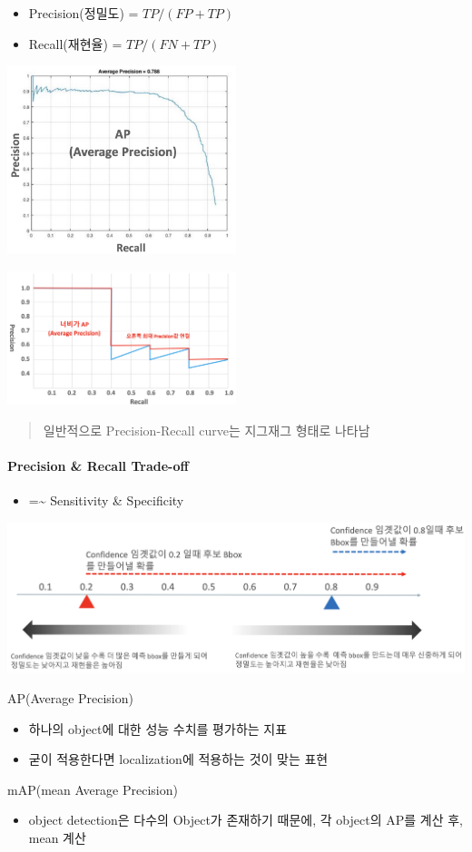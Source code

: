 \documentclass[
]{article}
\providecommand{\tightlist}{%
  \setlength{\itemsep}{0pt}\setlength{\parskip}{0pt}}
\begin{document}
\begin{itemize}
\tightlist
\item
  Precision(정밀도) = \(TP/(FP+TP)\)
\item
  Recall(재현율) = \(TP/(FN+TP)\)
\end{itemize}

\includegraphics[width=0.5\textwidth,height=\textheight]{figs/Chapter1-7.png}

\includegraphics[width=0.5\textwidth,height=\textheight]{figs/Chapter1-9.png}

\begin{quote}
일반적으로 Precision-Recall curve는 지그재그 형태로 나타남
\end{quote}

\hypertarget{precision-recall-trade-off}{%
\paragraph{Precision \& Recall
Trade-off}\label{precision-recall-trade-off}}

\begin{itemize}
\tightlist
\item
  =\textasciitilde{} Sensitivity \& Specificity
\end{itemize}

\includegraphics{figs/Chapter1-8.png}

AP(Average Precision)

\begin{itemize}
\tightlist
\item
  하나의 object에 대한 성능 수치를 평가하는 지표
\item
  굳이 적용한다면 localization에 적용하는 것이 맞는 표현
\end{itemize}

mAP(mean Average Precision)

\begin{itemize}
\tightlist
\item
  object detection은 다수의 Object가 존재하기 때문에, 각 object의 AP를
  계산 후, mean 계산
\end{itemize}
\end{document}
